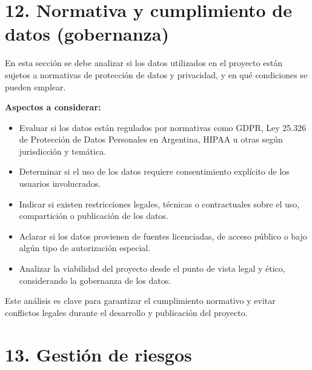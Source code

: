 \documentclass[
11pt, %
]{charter}
\begin{document}
\section{12. Normativa y cumplimiento de datos (gobernanza)}

En esta sección se debe analizar si los datos utilizados en el proyecto están sujetos a normativas de protección de datos y privacidad, y en qué condiciones se pueden emplear.

\textbf{Aspectos a considerar:}
\begin{itemize}
  \item Evaluar si los datos están regulados por normativas como GDPR, Ley 25.326 de Protección de Datos Personales en Argentina, HIPAA u otras según jurisdicción y temática.
  \item Determinar si el uso de los datos requiere consentimiento explícito de los usuarios involucrados.
  \item Indicar si existen restricciones legales, técnicas o contractuales sobre el uso, compartición o publicación de los datos.
  \item Aclarar si los datos provienen de fuentes licenciadas, de acceso público o bajo algún tipo de autorización especial.
  \item Analizar la viabilidad del proyecto desde el punto de vista legal y ético, considerando la gobernanza de los datos.
\end{itemize}

Este análisis es clave para garantizar el cumplimiento normativo y evitar conflictos legales durante el desarrollo y publicación del proyecto.


\section{13. Gestión de riesgos}
\label{sec:riesgos}
\end{document}
